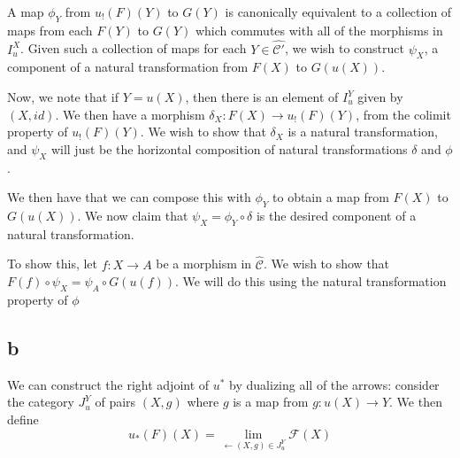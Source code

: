 \documentclass[a4paper]{article}
\theoremstyle{named}
\let\tempb\subsection
\renewcommand{\subsection}[1]{\tempb*{#1}}
\begin{document}
A map $\phi_Y$ from $u_!(F)(Y)$ to $G(Y)$ is canonically equivalent to a collection of maps from each $F(Y)$ to $G(Y)$ which commutes with all of the morphisms in $I_u^X$. Given such a collection of maps for each $Y \in \hat{\mathcal{C}'}$, we wish to construct $\psi_X$, a component of a natural transformation from $F(X)$ to $G(u(X))$.

Now, we note that if $Y = u(X)$, then there is an element of $I_u^Y$ given by $(X, id)$. We then have a morphism $\delta_X : F(X) \rightarrow u_!(F)(Y)$, from the colimit property of $u_!(F)(Y)$. We wish to show that $\delta_X$ is a natural transformation, and $\psi_X$ will just be the horizontal composition of natural transformations $\delta$ and $\phi$.


We then have that we can compose this with $\phi_Y$ to obtain a map from $F(X)$ to $G(u(X))$. We now claim that $\psi_X = \phi_Y \circ \delta$ is the desired component of a natural transformation.

To show this, let $f : X \rightarrow A$ be a morphism in $\hat{\mathcal{C}}$. We wish to show that $F(f)\circ \psi_X = \psi_A \circ G(u(f))$.
We will do this using the natural transformation property of $\phi$

\subsection{b}
We can construct the right adjoint of $u^*$ by dualizing all of the arrows: consider the category $J_u^Y$ of pairs $(X, g)$ where $g$ is a map from $g:u(X)\rightarrow Y$. We then define 
\[
    u_*(F)(X) = \lim_{\leftarrow (X, g) \in J_u^Y} \mathcal{F}(X)
\]
\end{document}
